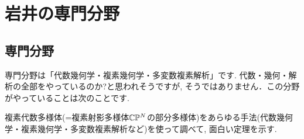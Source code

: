 
\section{岩井の専門分野}
\label{sec-1}

\subsection{専門分野}\vspace{-6pt}
\label{subsec-senmon}
専門分野は「代数幾何学・複素幾何学・多変数複素解析」です. 代数・幾何・解析の全部をやっているのか?と思われそうですが, そうではありません．この分野がやっていることは次のことです. 

\begin{tcolorbox}[mybox]
複素代数多様体(=複素射影多様体$\mathbb{C}\mathbb{P}^N$の部分多様体)をあらゆる手法(代数幾何学・複素幾何学・多変数複素解析など)を使って調べて, 面白い定理を示す.
 \end{tcolorbox}
 
